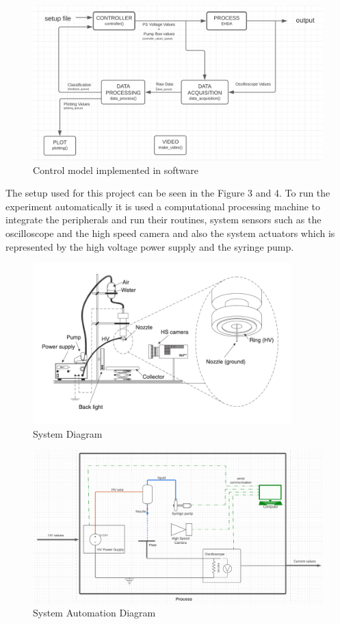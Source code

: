 \begin{figure}[H]
    \center
    \includegraphics[width=14cm]{images/software-design.png}
    \caption{Control model implemented in software}
\end{figure}

The setup used for this project can be seen in the Figure 3 and 4. To run the experiment automatically it is used a computational processing machine to integrate the peripherals and run their routines, system sensors such as the oscilloscope and the high speed camera 
and also the system actuators which is represented by the high voltage power supply and the syringe pump. 

\begin{figure}[H]
    \center
    \includegraphics[width=10cm]{images/system_setup.png}
    \caption{System Diagram}
\end{figure}

\begin{figure}[H]
    \center
    \includegraphics[width=14cm]{images/system-design.png}
    \caption{System Automation Diagram}
\end{figure}


